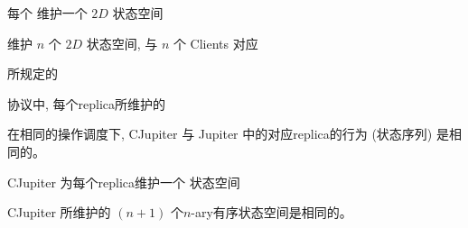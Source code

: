 \begin{frame}{}
  \centerline{\large 每个  维护一个 $2D$ 状态空间}


  \centerline{\large {} 维护 $n$ 个 $2D$ 状态空间, 与 $n$ 个 Clients 对应}
\end{frame}

\begin{frame}{}
  \begin{center}
    {\large \blue{\wlspec{}} 所规定的}

    \vspace{0.20cm}
    \vspace{0.20cm}

    {\large {} 协议中, 每个replica所维护的}
  \end{center}
\end{frame}

\begin{frame}{}
  \centerline{\LARGE {}}

  \pause
  \vspace{1.0cm}
  \begin{Theorem}[等价性]
    在相同的操作调度下, CJupiter 与 Jupiter 中的对应replica的行为 {\small (状态序列)} 是相同的。
  \end{Theorem}
\end{frame}

\begin{frame}{}
  \begin{center}
    {\large CJupiter 为每个replica维护一个  状态空间}
  \end{center}

\end{frame}

\begin{frame}{}
  \begin{center}
    \begin{prop}
      {\large CJupiter 所维护的 $(n+1)$ 个$n$-ary有序状态空间是相同的。}
    \end{prop}

    \resizebox{0.50\textwidth}{!}{}

  \end{center}
\end{frame}

